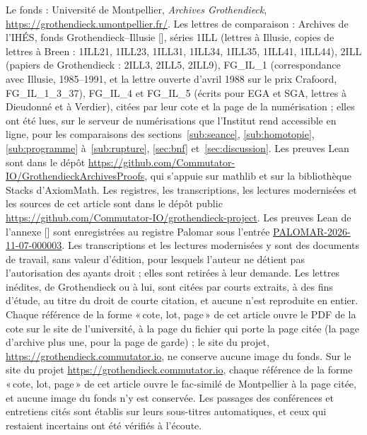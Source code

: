 \documentclass[11pt]{amsart}
\newcommand{\mot}[1]{«\,#1\,»}
\newcommand{\palomar}{\href{https://palomar-registry.org/entry.html?id=PALOMAR-2026-11-07-000003}{PALOMAR-2026-11-07-000003}}
\newcommand{\autocite}[1]{\citealp{hua2026#1}}
\begin{document}
Le fonds : Université de Montpellier, \emph{Archives Grothendieck}, \url{https://grothendieck.umontpellier.fr/}. Les lettres de comparaison : Archives de l'IHÉS, fonds Grothendieck--Illusie [\citealp{ihesillusie}], séries 1ILL (lettres à Illusie, copies de lettres à Breen : 1ILL21, 1ILL23, 1ILL31, 1ILL34, 1ILL35, 1ILL41, 1ILL44), 2ILL (papiers de Grothendieck : 2ILL3, 2ILL5, 2ILL9), FG\_IL\_1 (correspondance avec Illusie, 1985--1991, et la lettre ouverte d'avril 1988 sur le prix Crafoord, FG\_IL\_1\_3\_37), FG\_IL\_4 et FG\_IL\_5 (écrits pour EGA et SGA, lettres à Dieudonné et à Verdier), citées par leur cote et la page de la numérisation ; elles ont été lues, sur le serveur de numérisations que l'Institut rend accessible en ligne, pour les comparaisons des sections~\ref{sub:seance}, \ref{sub:homotopie}, \ref{sub:programme} à~\ref{sub:rupture}, \ref{sec:bnf} et~\ref{sec:discussion}.  Les preuves Lean sont dans le dépôt \url{https://github.com/Commutator-IO/GrothendieckArchivesProofs}, qui s'appuie sur mathlib et sur la bibliothèque Stacks d'AxiomMath. Les registres, les transcriptions, les lectures modernisées et les sources de cet article sont dans le dépôt public \url{https://github.com/Commutator-IO/grothendieck-project}. \ifdefined\hexagon Les preuves Lean de l'annexe [\autocite{b}] sont enregistrées au registre Palomar sous l'entrée \palomar. \fi Les transcriptions et les lectures modernisées y sont des documents de travail, sans valeur d'édition, pour lesquels l'auteur ne détient pas l'autorisation des ayants droit ; elles sont retirées à leur demande. Les lettres inédites, de Grothendieck ou à lui, sont citées par courts extraits, à des fins d'étude, au titre du droit de courte citation, et aucune n'est reproduite en entier. \ifdefined\hexagon Chaque référence de la forme \mot{cote, lot, page} de cet article ouvre le PDF de la cote sur le site de l'université, à la page du fichier qui porte la page citée (la page d'archive plus une, pour la page de garde) ; le site du projet, \url{https://grothendieck.commutator.io}, ne conserve aucune image du fonds. \else Sur le site du projet \url{https://grothendieck.commutator.io}, chaque référence de la forme \mot{cote, lot, page} de cet article ouvre le fac-similé de Montpellier à la page citée, et aucune image du fonds n'y est conservée. \fi Les passages des conférences et entretiens cités sont établis sur leurs sous-titres automatiques, et ceux qui restaient incertains ont été vérifiés à l'écoute.\par\endgroup



\end{document}
